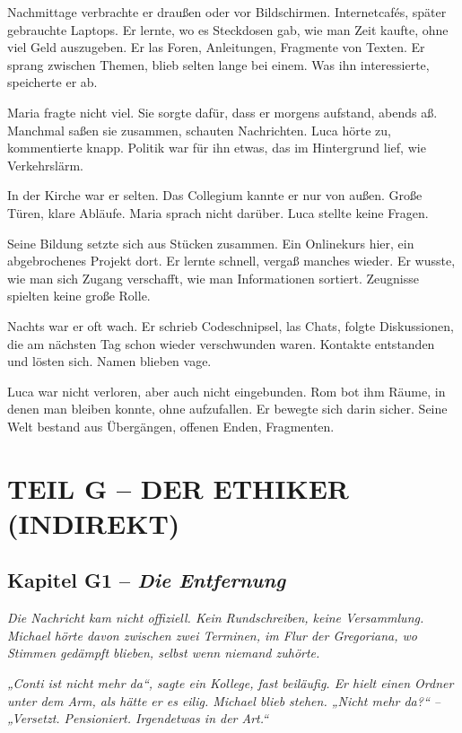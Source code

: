 \documentclass[
]{article}
\begin{document}
Nachmittage verbrachte er draußen oder vor Bildschirmen. Internetcafés, später gebrauchte Laptops. Er lernte, wo es Steckdosen gab, wie man Zeit kaufte, ohne viel Geld auszugeben. Er las Foren, Anleitungen, Fragmente von Texten. Er sprang zwischen Themen, blieb selten lange bei einem. Was ihn interessierte, speicherte er ab.

Maria fragte nicht viel. Sie sorgte dafür, dass er morgens aufstand, abends aß. Manchmal saßen sie zusammen, schauten Nachrichten. Luca hörte zu, kommentierte knapp. Politik war für ihn etwas, das im Hintergrund lief, wie Verkehrslärm.

In der Kirche war er selten. Das Collegium kannte er nur von außen. Große Türen, klare Abläufe. Maria sprach nicht darüber. Luca stellte keine Fragen.

Seine Bildung setzte sich aus Stücken zusammen. Ein Onlinekurs hier, ein abgebrochenes Projekt dort. Er lernte schnell, vergaß manches wieder. Er wusste, wie man sich Zugang verschafft, wie man Informationen sortiert. Zeugnisse spielten keine große Rolle.

Nachts war er oft wach. Er schrieb Codeschnipsel, las Chats, folgte Diskussionen, die am nächsten Tag schon wieder verschwunden waren. Kontakte entstanden und lösten sich. Namen blieben vage.

Luca war nicht verloren, aber auch nicht eingebunden. Rom bot ihm Räume, in denen man bleiben konnte, ohne aufzufallen. Er bewegte sich darin sicher. Seine Welt bestand aus Übergängen, offenen Enden, Fragmenten.

\section{TEIL G -- DER ETHIKER (INDIREKT)}\label{teil-g-der-ethiker-indirekt}

\subsection{\texorpdfstring{Kapitel G1 -- \emph{Die Entfernung}}{Kapitel G1 -- Die Entfernung}}\label{kapitel-g1-die-entfernung}

\emph{Die Nachricht kam nicht offiziell. Kein Rundschreiben, keine Versammlung. Michael hörte davon zwischen zwei Terminen, im Flur der Gregoriana, wo Stimmen gedämpft blieben, selbst wenn niemand zuhörte.}

\emph{„Conti ist nicht mehr da``, sagte ein Kollege, fast beiläufig. Er hielt einen Ordner unter dem Arm, als hätte er es eilig. Michael blieb stehen. „Nicht mehr da?{\kern0pt}`` -- „Versetzt. Pensioniert. Irgendetwas in der Art.``}
\end{document}
